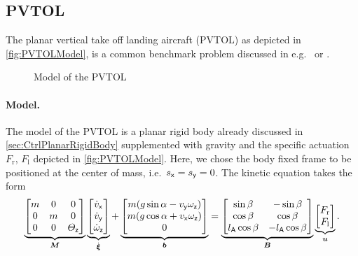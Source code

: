\subsection{PVTOL}\label{sec:CtrlExamplePVTOL}
The planar vertical take off landing aircraft (PVTOL) as depicted in \autoref{fig:PVTOLModel}, is a common benchmark problem discussed in e.g.\ \cite{Hauser:PVTOL} or \cite{Fliess:LieBacklund}.
\begin{figure}
 \centering
 
 \caption{Model of the PVTOL}
 \label{fig:PVTOLModel}
\end{figure}

\paragraph{Model.}
The model of the PVTOL is a planar rigid body already discussed in \autoref{sec:CtrlPlanarRigidBody} supplemented with gravity and the specific actuation $F_\text{r}$, $F_\text{l}$ depicted in \autoref{fig:PVTOLModel}.
Here, we chose the body fixed frame to be positioned at the center of mass, i.e.\ $s_{\mathsf{x}} = s_{\mathsf{y}} = 0$.
The kinetic equation takes the form
\begin{align}
 \underbrace{\begin{bmatrix} m & 0 & 0 \\ 0 & m & 0 \\ 0 & 0 & \varTheta_{\mathsf{z}} \end{bmatrix}}_{\boldsymbol{M}}
 \underbrace{\begin{bmatrix} \dot{v}_{\mathsf{x}} \\ \dot{v}_{\mathsf{y}} \\ \dot{\omega}_{\mathsf{z}} \end{bmatrix}}_{\dot{\boldsymbol{\xi}}}
 +
 \underbrace{\begin{bmatrix} m(g \sin\alpha - v_{\mathsf{y}} \omega_{\mathsf{z}}) \\ m (g \cos\alpha + v_{\mathsf{x}} \omega_{\mathsf{z}}) \\ 0 \end{bmatrix}}_{\boldsymbol{b}}
 =
 \underbrace{\begin{bmatrix} \sin\beta & -\sin\beta \\ \cos\beta & \cos\beta \\ l_{\mathsf{A}} \cos\beta & -l_{\mathsf{A}}\cos\beta \end{bmatrix}}_{\boldsymbol{B}}
 \underbrace{\begin{bmatrix} F_\text{r} \\ F_\text{l} \end{bmatrix}}_{\boldsymbol{u}}
 .
\end{align}
